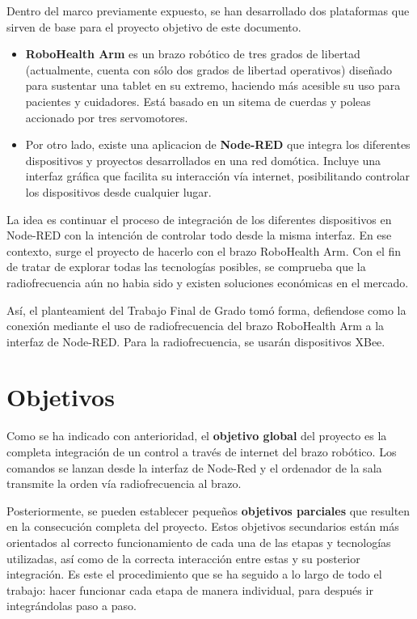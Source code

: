 Dentro del marco previamente expuesto, se han desarrollado dos plataformas que sirven de base para el proyecto objetivo de este documento.

\begin{itemize}
\item \textbf{RoboHealth Arm} es un brazo robótico de tres grados de libertad (actualmente, cuenta con sólo dos grados de libertad operativos) diseñado para sustentar una tablet en su extremo, haciendo más acesible su uso para pacientes y cuidadores. Está basado en un sitema de cuerdas y poleas accionado por tres servomotores.
\item Por otro lado, existe una aplicacion de \textbf{Node-RED} que integra los diferentes dispositivos y proyectos desarrollados en una red domótica. Incluye una interfaz gráfica que facilita su interacción vía internet, posibilitando controlar los dispositivos desde cualquier lugar.
\end{itemize} 

La idea es continuar el proceso de integración de los diferentes dispositivos en Node-RED con la intención de controlar todo desde la misma interfaz. En ese contexto, surge el proyecto de hacerlo con el brazo RoboHealth Arm. Con el fin de tratar de explorar todas las tecnologías posibles, se comprueba que la radiofrecuencia aún no habia sido y existen soluciones económicas en el mercado.

Así, el planteamient del Trabajo Final de Grado tomó forma, defiendose como la conexión mediante el uso de radiofrecuencia del brazo RoboHealth Arm a la interfaz de Node-RED. Para la radiofrecuencia, se usarán dispositivos XBee.

\section{Objetivos}\label{sec:refobj}

Como se ha indicado con anterioridad, el \textbf{objetivo global} del proyecto es la completa integración de un control a través de internet del brazo robótico. Los comandos se lanzan desde la interfaz de Node-Red y el ordenador de la sala transmite la orden vía radiofrecuencia al brazo.

Posteriormente, se pueden establecer pequeños \textbf{objetivos parciales} que resulten en la consecución completa del proyecto. Estos objetivos secundarios están más orientados al correcto funcionamiento de cada una de las etapas y tecnologías utilizadas, así como de la correcta interacción entre estas y su posterior integración. Es este el procedimiento que se ha seguido a lo largo de todo el trabajo: hacer funcionar cada etapa de manera individual, para después ir integrándolas paso a paso.

